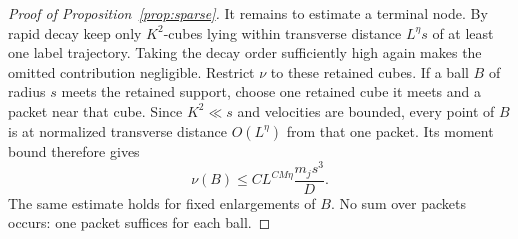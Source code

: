 \begin{proof}[Proof of Proposition~\ref{prop:sparse}]
It remains to estimate a terminal node.  By rapid decay keep only
$K^2$-cubes lying within transverse distance $L^\eta s$ of at least
one label trajectory.  Taking the decay order sufficiently high
again makes the omitted contribution negligible.  Restrict $\nu$ to
these retained cubes.  If a ball $B$ of radius $s$ meets the retained
support, choose one retained cube it meets and a packet near that
cube.  Since $K^2\ll s$ and velocities are bounded, every point of
$B$ is at normalized transverse distance $O(L^\eta)$ from that one
packet.  Its moment bound therefore gives
\begin{equation}\label{eq:sparse-terminal-mass}
 \nu(B)\le C L^{CM\eta}\frac{m_js^3}{D}.
\end{equation}
The same estimate holds for fixed enlargements of $B$.  No sum over
packets occurs: one packet suffices for each ball.


\end{proof}

